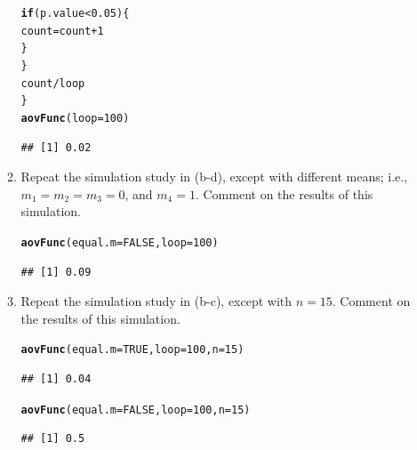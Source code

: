 \documentclass{article}\usepackage[]{graphicx}\usepackage[]{color}
\makeatletter
\newcommand{\hlnum}[1]{\textcolor[rgb]{0.686,0.059,0.569}{#1}}%
\newcommand{\hlopt}[1]{\textcolor[rgb]{0,0,0}{#1}}%
\newcommand{\hlstd}[1]{\textcolor[rgb]{0.345,0.345,0.345}{#1}}%
\newcommand{\hlkwa}[1]{\textcolor[rgb]{0.161,0.373,0.58}{\textbf{#1}}}%
\newcommand{\hlkwb}[1]{\textcolor[rgb]{0.69,0.353,0.396}{#1}}%
\newcommand{\hlkwc}[1]{\textcolor[rgb]{0.333,0.667,0.333}{#1}}%
\newcommand{\hlkwd}[1]{\textcolor[rgb]{0.737,0.353,0.396}{\textbf{#1}}}%
\newenvironment{kframe}{%
 \def\at@end@of@kframe{}%
 \ifinner\ifhmode%
  \def\at@end@of@kframe{\end{minipage}}%
  \begin{minipage}{\columnwidth}%
 \fi\fi%
 \def\FrameCommand##1{\hskip\@totalleftmargin \hskip-\fboxsep
 \colorbox{shadecolor}{##1}\hskip-\fboxsep
     \hskip-\linewidth \hskip-\@totalleftmargin \hskip\columnwidth}%
 \MakeFramed {\advance\hsize-\width
   \@totalleftmargin\z@ \linewidth\hsize
   \@setminipage}}%
 {\par\unskip\endMakeFramed%
 \at@end@of@kframe}
\newenvironment{knitrout}{}{} %
\makeatother
\begin{document}
\begin{enumerate}
\begin{enumerate}
\begin{knitrout}
\begin{kframe}
\begin{alltt}
    \hlkwa{if}\hlstd{(p.value}\hlopt{<}\hlnum{0.05}\hlstd{)\{}
     \hlstd{count}\hlkwb{=}\hlstd{count}\hlopt{+}\hlnum{1}
    \hlstd{\}}
  \hlstd{\}}
  \hlstd{count}\hlopt{/}\hlstd{loop}
\hlstd{\}}
\hlkwd{aovFunc}\hlstd{(}\hlkwc{loop}\hlstd{=}\hlnum{100}\hlstd{)}
\end{alltt}
\begin{verbatim}
## [1] 0.02
\end{verbatim}
\end{kframe}
\end{knitrout}

  \item Repeat the simulation study in (b-d), except with different means; i.e.,
  $m_1=m_2=m_3=0$, and $m_4=1$. Comment on the results of this simulation.

\begin{knitrout}
\color{fgcolor}\begin{kframe}
\begin{alltt}
\hlkwd{aovFunc}\hlstd{(}\hlkwc{equal.m}\hlstd{=}\hlnum{FALSE}\hlstd{,} \hlkwc{loop}\hlstd{=}\hlnum{100}\hlstd{)}
\end{alltt}
\begin{verbatim}
## [1] 0.09
\end{verbatim}
\end{kframe}
\end{knitrout}
\item Repeat the simulation study in (b-c), except with $n=15$. Comment on the results of this simulation.
\begin{knitrout}
\color{fgcolor}\begin{kframe}
\begin{alltt}
\hlkwd{aovFunc}\hlstd{(}\hlkwc{equal.m}\hlstd{=}\hlnum{TRUE}\hlstd{,} \hlkwc{loop}\hlstd{=}\hlnum{100}\hlstd{,} \hlkwc{n}\hlstd{=}\hlnum{15}\hlstd{)}
\end{alltt}
\begin{verbatim}
## [1] 0.04
\end{verbatim}
\begin{alltt}
\hlkwd{aovFunc}\hlstd{(}\hlkwc{equal.m}\hlstd{=}\hlnum{FALSE}\hlstd{,} \hlkwc{loop}\hlstd{=}\hlnum{100}\hlstd{,} \hlkwc{n}\hlstd{=}\hlnum{15}\hlstd{)}
\end{alltt}
\begin{verbatim}
## [1] 0.5
\end{verbatim}
\end{kframe}
\end{knitrout}

\end{enumerate}
\end{enumerate}
\end{document}
